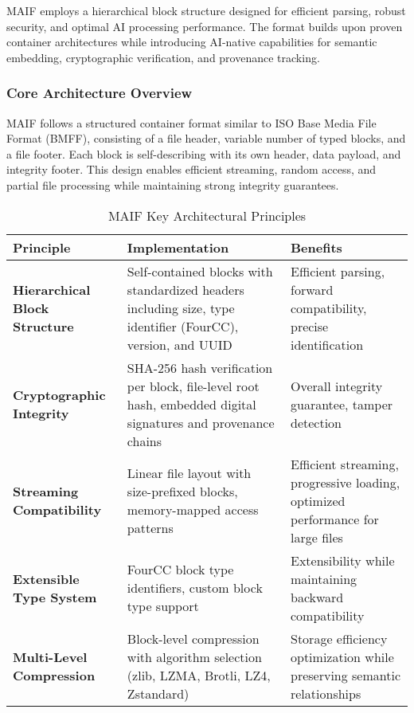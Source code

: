 \documentclass[conference]{IEEEtran}
\begin{document}
MAIF employs a hierarchical block structure designed for efficient parsing, robust security, and optimal AI processing performance. The format builds upon proven container architectures while introducing AI-native capabilities for semantic embedding, cryptographic verification, and provenance tracking.

\subsubsection{Core Architecture Overview}

MAIF follows a structured container format similar to ISO Base Media File Format (BMFF), consisting of a file header, variable number of typed blocks, and a file footer. Each block is self-describing with its own header, data payload, and integrity footer. This design enables efficient streaming, random access, and partial file processing while maintaining strong integrity guarantees.

\begin{table*}[!t]
\renewcommand{\arraystretch}{1.3}
\caption{MAIF Key Architectural Principles}
\label{tab:architectural-principles}
\centering
\footnotesize
\begin{tabular}{p{3.5cm}p{6cm}p{4.5cm}}
\toprule
\textbf{Principle} & \textbf{Implementation} & \textbf{Benefits} \\
\midrule
\textbf{Hierarchical Block Structure} & Self-contained blocks with standardized headers including size, type identifier (FourCC), version, and UUID & Efficient parsing, forward compatibility, precise identification \\
\textbf{Cryptographic Integrity} & SHA-256 hash verification per block, file-level root hash, embedded digital signatures and provenance chains & Overall integrity guarantee, tamper detection \\
\textbf{Streaming Compatibility} & Linear file layout with size-prefixed blocks, memory-mapped access patterns & Efficient streaming, progressive loading, optimized performance for large files \\
\textbf{Extensible Type System} & FourCC block type identifiers, custom block type support & Extensibility while maintaining backward compatibility \\
\textbf{Multi-Level Compression} & Block-level compression with algorithm selection (zlib, LZMA, Brotli, LZ4, Zstandard) & Storage efficiency optimization while preserving semantic relationships \\
\bottomrule
\end{tabular}
\end{table*}
\end{document}
